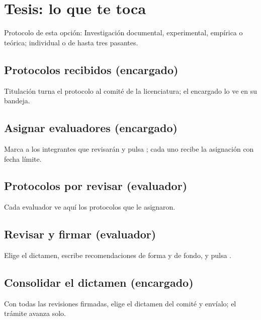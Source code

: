 \section{Tesis: lo que te toca}
Protocolo de esta opción: Investigación documental, experimental, empírica o teórica; individual o de hasta tres pasantes.
\subsection{Protocolos recibidos (encargado)}
Titulación turna el protocolo al comité de la licenciatura; el encargado lo ve en su bandeja.
\subsection{Asignar evaluadores (encargado)}
Marca a los integrantes que revisarán y pulsa ; cada uno recibe la asignación con fecha límite.
\subsection{Protocolos por revisar (evaluador)}
Cada evaluador ve aquí los protocolos que le asignaron.
\subsection{Revisar y firmar (evaluador)}
Elige el dictamen, escribe recomendaciones de forma y de fondo, y pulsa .
\subsection{Consolidar el dictamen (encargado)}
Con todas las revisiones firmadas, elige el dictamen del comité y envíalo; el trámite avanza solo.

